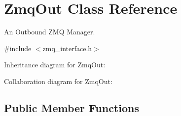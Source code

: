 \hypertarget{classZmqOut}{}\section{Zmq\+Out Class Reference}
\label{classZmqOut}


An Outbound Z\+MQ Manager.  




{\ttfamily \#include $<$zmq\+\_\+interface.\+h$>$}



Inheritance diagram for Zmq\+Out\+:


Collaboration diagram for Zmq\+Out\+:
\subsection*{Public Member Functions}
